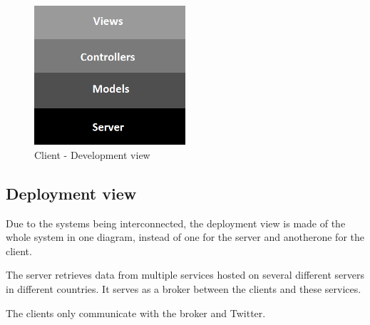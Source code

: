 \documentclass[11pt]{book}
\begin{document}
\begin{figure}[H]
      \centering
      \includegraphics[width=0.5\textwidth]{Figures/Architecture/clientDevelopmentView.png}
      \caption{Client - Development view}
      \label{fig:arch_client_development}
\end{figure}

\subsection{Deployment view}
Due to the systems being interconnected, the deployment view is made of the whole system in one diagram, instead of one for the server and anotherone for the client.

The server retrieves data from multiple services hosted on several different servers in different countries. It serves as a broker between the clients and these services.

The clients only communicate with the broker and Twitter.
\end{document}
